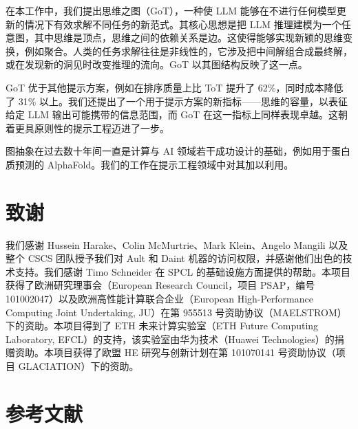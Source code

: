 \documentclass[11pt,UTF8,fontset=fandol]{ctexart}
\begin{document}
在本工作中，我们提出思维之图（GoT），一种使 LLM 能够在不进行任何模型更新的情况下有效求解不同任务的新范式。其核心思想是把 LLM 推理建模为一个任意图，其中思维是顶点，思维之间的依赖关系是边。这使得能够实现新颖的思维变换，例如聚合。人类的任务求解往往是非线性的，它涉及把中间解组合成最终解，或在发现新的洞见时改变推理的流向。GoT 以其图结构反映了这一点。

GoT 优于其他提示方案，例如在排序质量上比 ToT 提升了 62\%，同时成本降低了 31\% 以上。我们还提出了一个用于提示方案的新指标——思维的容量，以表征给定 LLM 输出可能携带的信息范围，而 GoT 在这一指标上同样表现卓越。这朝着更具原则性的提示工程迈进了一步。

图抽象在过去数十年间一直是计算与 AI 领域若干成功设计的基础，例如用于蛋白质预测的 AlphaFold。我们的工作在提示工程领域中对其加以利用。

\section*{致谢}

我们感谢 Hussein Harake、Colin McMurtrie、Mark Klein、Angelo Mangili 以及整个 CSCS 团队授予我们对 Ault 和 Daint 机器的访问权限，并感谢他们出色的技术支持。我们感谢 Timo Schneider 在 SPCL 的基础设施方面提供的帮助。本项目获得了欧洲研究理事会（European Research Council，项目 PSAP，编号 101002047）以及欧洲高性能计算联合企业（European High-Performance Computing Joint Undertaking, JU）在第 955513 号资助协议（MAELSTROM）下的资助。本项目得到了 ETH 未来计算实验室（ETH Future Computing Laboratory, EFCL）的支持，该实验室由华为技术（Huawei Technologies）的捐赠资助。本项目获得了欧盟 HE 研究与创新计划在第 101070141 号资助协议（项目 GLACIATION）下的资助。

\section*{参考文献}
\end{document}
